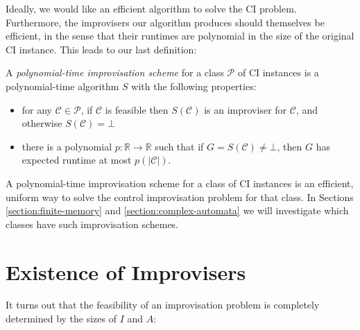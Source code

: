 \documentclass[a4paper,USenglish,numberwithinsect]{lipics}
\theoremstyle{plain}
\theoremstyle{definition}
\newcommand{\improvs}{I}
\newcommand{\valids}{A}
\begin{document}
Ideally, we would like an efficient algorithm to solve the CI problem. Furthermore,
the improvisers our algorithm produces should themselves be efficient, in the sense
that their runtimes are polynomial in the size of the original CI
instance. This leads to our last definition: 

\begin{definition}
A \emph{polynomial-time improvisation scheme} for a class
$\mathcal{P}$ of CI instances is a polynomial-time algorithm $S$
with the following properties: 
\begin{itemize}
\item for any $\mathcal{C} \in \mathcal{P}$, if $\mathcal{C}$ is
feasible then $S(\mathcal{C})$ is an improviser for $\mathcal{C}$, and
otherwise $S(\mathcal{C}) = \bot$  
\item there is a polynomial $p:\mathbb{R}\rightarrow \mathbb{R}$
such that if $G = S(\mathcal{C}) \ne \bot$, then $G$
has expected runtime at most $p(|\mathcal{C}|)$. 
\end{itemize}
\end{definition}

A polynomial-time improvisation scheme for a class of CI instances is
an efficient, uniform way to solve the control improvisation problem
for that class. In Sections \ref{section:finite-memory} and
\ref{section:complex-automata} we will investigate which classes have
such improvisation schemes. 

\section{Existence of Improvisers} \label{section:existence}

It turns out that the feasibility of an improvisation problem is completely determined by the sizes of $\improvs$ and $\valids$:
\end{document}
